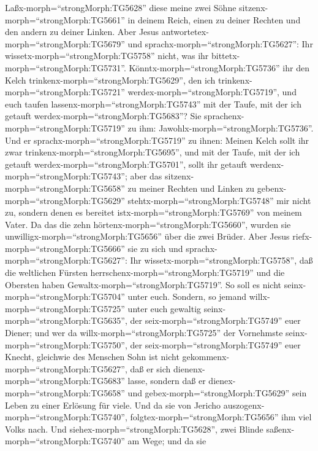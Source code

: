 Laßx-morph=``strongMorph:TG5628'' diese meine zwei Söhne
sitzenx-morph=``strongMorph:TG5661'' in deinem Reich, einen zu deiner
Rechten und den andern zu deiner Linken.  Aber Jesus
antwortetex-morph=``strongMorph:TG5679'' und
sprachx-morph=``strongMorph:TG5627'': Ihr
wissetx-morph=``strongMorph:TG5758'' nicht, was ihr
bittetx-morph=``strongMorph:TG5731''.
Könntx-morph=``strongMorph:TG5736'' ihr den Kelch
trinkenx-morph=``strongMorph:TG5629'', den ich
trinkenx-morph=``strongMorph:TG5721''
werdex-morph=``strongMorph:TG5719'', und euch taufen
lassenx-morph=``strongMorph:TG5743'' mit der Taufe, mit der ich getauft
werdex-morph=``strongMorph:TG5683''? Sie
sprachenx-morph=``strongMorph:TG5719'' zu ihm:
Jawohlx-morph=``strongMorph:TG5736''.  Und er
sprachx-morph=``strongMorph:TG5719'' zu ihnen: Meinen Kelch sollt ihr
zwar trinkenx-morph=``strongMorph:TG5695'', und mit der Taufe, mit der
ich getauft werdex-morph=``strongMorph:TG5701'', sollt ihr getauft
werdenx-morph=``strongMorph:TG5743''; aber das
sitzenx-morph=``strongMorph:TG5658'' zu meiner Rechten und Linken zu
gebenx-morph=``strongMorph:TG5629'' stehtx-morph=``strongMorph:TG5748''
mir nicht zu, sondern denen es bereitet
istx-morph=``strongMorph:TG5769'' von meinem Vater.  Da das
die zehn hörtenx-morph=``strongMorph:TG5660'', wurden sie
unwilligx-morph=``strongMorph:TG5656'' über die zwei Brüder.
 Aber Jesus riefx-morph=``strongMorph:TG5666'' sie zu sich
und sprachx-morph=``strongMorph:TG5627'': Ihr
wissetx-morph=``strongMorph:TG5758'', daß die weltlichen Fürsten
herrschenx-morph=``strongMorph:TG5719'' und die Obersten haben
Gewaltx-morph=``strongMorph:TG5719''.  So soll es nicht
seinx-morph=``strongMorph:TG5704'' unter euch. Sondern, so jemand
willx-morph=``strongMorph:TG5725'' unter euch gewaltig
seinx-morph=``strongMorph:TG5635'', der
seix-morph=``strongMorph:TG5749'' euer Diener;  und wer da
willx-morph=``strongMorph:TG5725'' der Vornehmste
seinx-morph=``strongMorph:TG5750'', der
seix-morph=``strongMorph:TG5749'' euer Knecht,  gleichwie
des Menschen Sohn ist nicht gekommenx-morph=``strongMorph:TG5627'', daß
er sich dienenx-morph=``strongMorph:TG5683'' lasse, sondern daß er
dienex-morph=``strongMorph:TG5658'' und
gebex-morph=``strongMorph:TG5629'' sein Leben zu einer Erlösung für
viele.  Und da sie von Jericho
auszogenx-morph=``strongMorph:TG5740'',
folgtex-morph=``strongMorph:TG5656'' ihm viel Volks nach. 
Und siehex-morph=``strongMorph:TG5628'', zwei Blinde
saßenx-morph=``strongMorph:TG5740'' am Wege; und da sie
